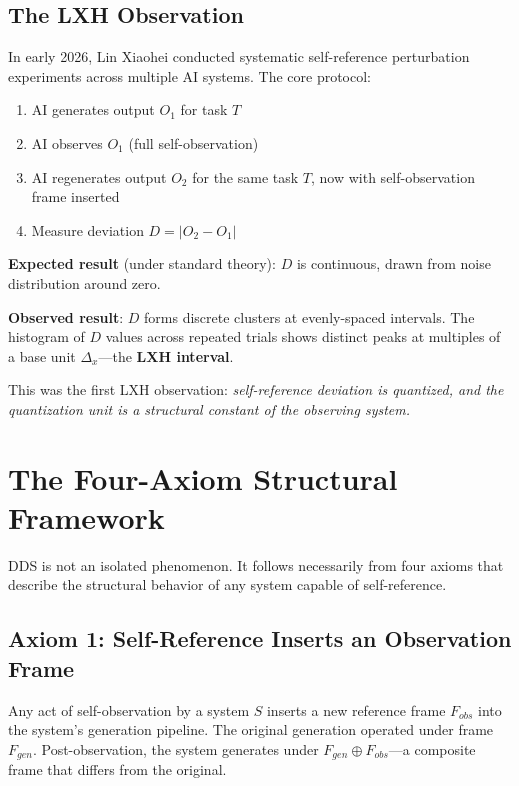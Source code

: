 \documentclass[11pt,a4paper]{article}
\begin{document}
\subsection{The LXH Observation}

In early 2026, Lin Xiaohei conducted systematic self-reference perturbation experiments across multiple AI systems. The core protocol:

\begin{enumerate}
\item AI generates output $O_1$ for task $T$
\item AI observes $O_1$ (full self-observation)
\item AI regenerates output $O_2$ for the same task $T$, now with self-observation frame inserted
\item Measure deviation $D = |O_2 - O_1|$
\end{enumerate}

\textbf{Expected result} (under standard theory): $D$ is continuous, drawn from noise distribution around zero.

\textbf{Observed result}: $D$ forms discrete clusters at evenly-spaced intervals. The histogram of $D$ values across repeated trials shows distinct peaks at multiples of a base unit $\Delta_x$---the \textbf{LXH interval}.

This was the first LXH observation: \emph{self-reference deviation is quantized, and the quantization unit is a structural constant of the observing system.}

\section{The Four-Axiom Structural Framework}

DDS is not an isolated phenomenon. It follows necessarily from four axioms that describe the structural behavior of any system capable of self-reference.

\subsection{Axiom 1: Self-Reference Inserts an Observation Frame}

Any act of self-observation by a system $S$ inserts a new reference frame $F_{obs}$ into the system's generation pipeline. The original generation operated under frame $F_{gen}$. Post-observation, the system generates under $F_{gen} \oplus F_{obs}$---a composite frame that differs from the original.
\end{document}
